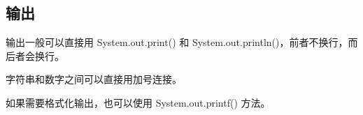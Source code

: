 \subsection{输出}
	输出一般可以直接用 System.out.print() 和 System.out.println()，前者不换行，而后者会换行。
	
	字符串和数字之间可以直接用加号连接。
	
	如果需要格式化输出，也可以使用 System.out.printf() 方法。